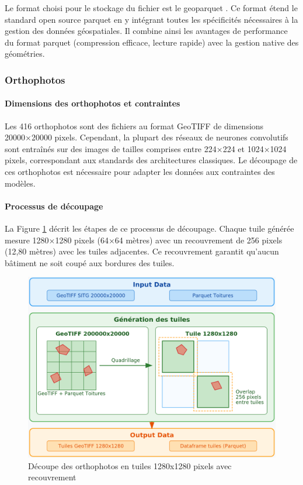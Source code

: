 Le format choisi pour le stockage du fichier est le geoparquet \cite{noauthor_geoparquet_nodate}. Ce format étend le standard open source parquet \cite{noauthor_parquet_nodate} en y intégrant toutes les spécificités nécessaires à la gestion des données géospatiales. Il combine ainsi les avantages de performance du format parquet (compression efficace, lecture rapide) avec la gestion native des géométries.

\newpage
\subsubsection{Orthophotos}
\label{subsubsec:decoupe_orthophoto_tuile}

\paragraph{Dimensions des orthophotos et contraintes}
Les 416 orthophotos sont des fichiers au format GeoTIFF de dimensions 20000×20000 pixels. Cependant, la plupart des réseaux de neurones convolutifs sont entraînés sur des images de tailles comprises entre 224×224 et 1024×1024 pixels, correspondant aux standards des architectures classiques. Le découpage de ces orthophotos est nécessaire pour adapter les données aux contraintes des modèles.

\paragraph{Processus de découpage}
La Figure \ref{fig:ch3_preparation_donnees_orthophotos_01_etl} décrit les étapes de ce processus de découpage. Chaque tuile générée mesure 1280×1280 pixels (64×64 mètres) avec un recouvrement de 256 pixels (12,80 mètres) avec les tuiles adjacentes. Ce recouvrement garantit qu'aucun bâtiment ne soit coupé aux bordures des tuiles.
\begin{figure}[H]
    \centering
    \includegraphics[width=1\linewidth]{02-main/figures/ch3/ch3_preparation_donnees_orthophotos_01_etl.png}
    \caption{Découpe des orthophotos en tuiles 1280x1280 pixels avec recouvrement}
    \label{fig:ch3_preparation_donnees_orthophotos_01_etl}
\end{figure}

